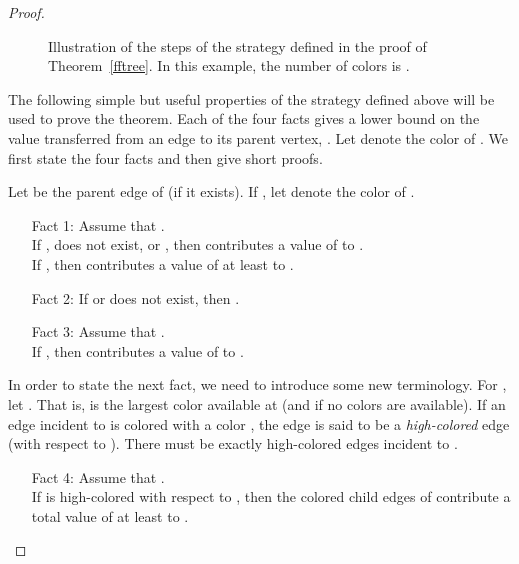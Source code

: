 \documentclass[smallextended]{svjour3}
\begin{document}
\begin{proof}
\begin{figure}
\caption{Illustration of the steps of the strategy defined in the proof of Theorem~\ref{fftree}. In this example, the number of colors is .}
\label{surplusfigure}
\end{figure}

The following simple but useful properties of the strategy defined
above will be used to prove the theorem.
Each of the four facts gives a lower bound on the value transferred
 from an edge  to its parent vertex, .
Let  denote the color of .
We first state the four facts and then give short proofs.

Let  be the parent edge of  (if it exists). 
If , let  denote the color of .

\begin{enumerate}[Fact 1:]
\item[Fact 1:]
{Assume that . \\
 If ,  does not exist, or , then  contributes
  a value of  to .\\ 
 If , then  contributes a value of at least
   to .
 }
\item[Fact 2:]
{If  or  does not exist, then . 
 } 
\item[Fact 3:]
{Assume that .\\
 If , then  contributes a value of  to
  .
 }
\end{enumerate}

In order to state the next fact, we need to introduce some new
terminology. For , let . That is,  is the
largest color available at  (and  if no colors are
available). If an edge incident to  is colored with a
color , the edge is said to be a \emph{high-colored} edge (with respect to ). There must be exactly  high-colored edges incident to .

\begin{enumerate}[Fact 4:]
\item[Fact 4:]
{Assume that .\\
 If  is high-colored with respect to , then the colored child
  edges of  contribute a total value of at least
   to .
 }
\end{enumerate}


\end{proof}
\end{document}
